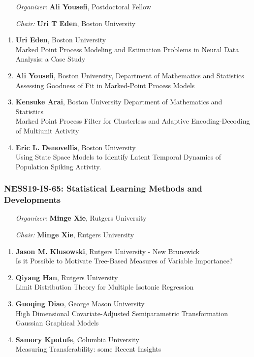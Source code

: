 \begin{enumerate}[align=left]
\item [\emph{Organizer:}] \textbf{Ali Yousefi}, Postdoctoral Fellow
\item [\emph{Chair:}] \textbf{Uri T Eden},  Boston University
\end{enumerate}

\begin{enumerate}
\item \textbf{Uri Eden}, Boston University \\
Marked Point Process Modeling and Estimation Problems in Neural Data Analysis: a Case Study
\item \textbf{Ali Yousefi}, Boston University, Department of Mathematics and Statistics \\
Assessing Goodness of Fit in Marked-Point Process Models
\item \textbf{Kensuke Arai}, Boston University Department of Mathematics and Statistics \\
Marked Point Process Filter for Clusterless and Adaptive Encoding-Decoding of Multiunit Activity
\item \textbf{Eric L. Denovellis}, Boston University \\
Using State Space Models to Identify Latent Temporal Dynamics of Population Spiking Activity.
\end{enumerate}

\subsubsection*{NESS19-IS-65: Statistical Learning Methods and Developments}

\begin{enumerate}[align=left]
\item [\emph{Organizer:}] \textbf{Minge Xie}, Rutgers University
\item [\emph{Chair:}] \textbf{Minge Xie}, Rutgers University
\end{enumerate}

\begin{enumerate}
\item \textbf{Jason M. Klusowski}, Rutgers University - New Brunswick \\
Is it Possible to Motivate Tree-Based Measures of Variable Importance?
\item \textbf{Qiyang Han}, Rutgers University \\
Limit Distribution Theory for Multiple Isotonic Regression
\item \textbf{Guoqing Diao}, George Mason University \\
High Dimensional Covariate-Adjusted Semiparametric Transformation Gaussian Graphical Models
\item \textbf{Samory Kpotufe}, Columbia University \\
Measuring Transferability: some Recent Insights
\end{enumerate}

